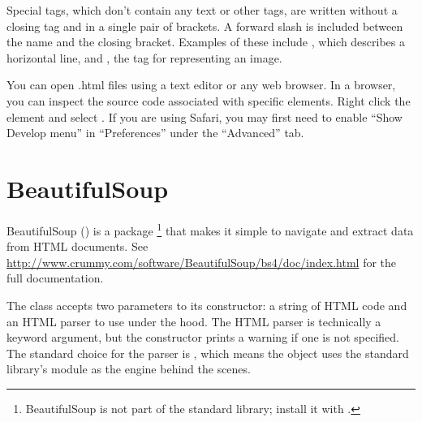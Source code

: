 Special tags, which don't contain any text or other tags, are written without a closing tag and in a single pair of brackets.
A forward slash is included between the name and the closing bracket.
Examples of these include , which describes a horizontal line, and , the tag for representing an image.
\begin{comment}
\begin{problem} %
Using the output from Problem \ref{prob:get-example.com}, examine the HTML source code for \url{http://www.example.com}.
What tags are used?
What is the value of the \li{<<type>>} attribute associated with the \li{style} tag?

Write a function that returns a set of the names of all tags the website uses and the value of the \li{<<type>>} attribute of the \li{style} tag (as a string). 
\\(Hint: there are ten unique tag names.)
\label{prob:look-at-example.com}
\end{problem}
\end{comment}

\begin{info}
You can open .html files using a text editor or any web browser.
In a browser, you can inspect the source code associated with specific elements.
Right click the element and select .
If you are using Safari, you may first need to enable ``Show Develop menu'' in ``Preferences'' under the ``Advanced'' tab.
\end{info}

\section*{BeautifulSoup} %

BeautifulSoup () is a package%
\footnote{BeautifulSoup is not part of the standard library; install it with .} that makes it simple to navigate and extract data from HTML documents.
See \url{http://www.crummy.com/software/BeautifulSoup/bs4/doc/index.html} for the full documentation.

The  class accepts two parameters to its constructor: a string of HTML code and an HTML parser to use under the hood.
The HTML parser is technically a keyword argument, but the constructor prints a warning if one is not specified.
The standard choice for the parser is , which means the object uses the standard library's  module as the engine behind the scenes.

